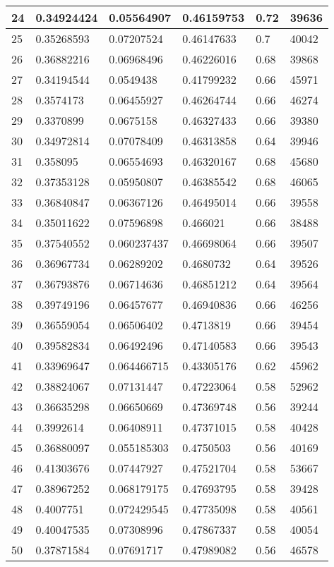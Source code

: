 \begin{longtable}{|l|l|l|l|l|l|}
24 & 0.34924424 & 0.05564907 & 0.46159753 & 0.72 & 39636 \\ \hline 
25 & 0.35268593 & 0.07207524 & 0.46147633 & 0.7 & 40042 \\ \hline 
26 & 0.36882216 & 0.06968496 & 0.46226016 & 0.68 & 39868 \\ \hline 
27 & 0.34194544 & 0.0549438 & 0.41799232 & 0.66 & 45971 \\ \hline 
28 & 0.3574173 & 0.06455927 & 0.46264744 & 0.66 & 46274 \\ \hline 
29 & 0.3370899 & 0.0675158 & 0.46327433 & 0.66 & 39380 \\ \hline 
30 & 0.34972814 & 0.07078409 & 0.46313858 & 0.64 & 39946 \\ \hline 
31 & 0.358095 & 0.06554693 & 0.46320167 & 0.68 & 45680 \\ \hline 
32 & 0.37353128 & 0.05950807 & 0.46385542 & 0.68 & 46065 \\ \hline 
33 & 0.36840847 & 0.06367126 & 0.46495014 & 0.66 & 39558 \\ \hline 
34 & 0.35011622 & 0.07596898 & 0.466021 & 0.66 & 38488 \\ \hline 
35 & 0.37540552 & 0.060237437 & 0.46698064 & 0.66 & 39507 \\ \hline 
36 & 0.36967734 & 0.06289202 & 0.4680732 & 0.64 & 39526 \\ \hline 
37 & 0.36793876 & 0.06714636 & 0.46851212 & 0.64 & 39564 \\ \hline 
38 & 0.39749196 & 0.06457677 & 0.46940836 & 0.66 & 46256 \\ \hline 
39 & 0.36559054 & 0.06506402 & 0.4713819 & 0.66 & 39454 \\ \hline 
40 & 0.39582834 & 0.06492496 & 0.47140583 & 0.66 & 39543 \\ \hline 
41 & 0.33969647 & 0.064466715 & 0.43305176 & 0.62 & 45962 \\ \hline 
42 & 0.38824067 & 0.07131447 & 0.47223064 & 0.58 & 52962 \\ \hline 
43 & 0.36635298 & 0.06650669 & 0.47369748 & 0.56 & 39244 \\ \hline 
44 & 0.3992614 & 0.06408911 & 0.47371015 & 0.58 & 40428 \\ \hline 
45 & 0.36880097 & 0.055185303 & 0.4750503 & 0.56 & 40169 \\ \hline 
46 & 0.41303676 & 0.07447927 & 0.47521704 & 0.58 & 53667 \\ \hline 
47 & 0.38967252 & 0.068179175 & 0.47693795 & 0.58 & 39428 \\ \hline 
48 & 0.4007751 & 0.072429545 & 0.47735098 & 0.58 & 40561 \\ \hline 
49 & 0.40047535 & 0.07308996 & 0.47867337 & 0.58 & 40054 \\ \hline 
50 & 0.37871584 & 0.07691717 & 0.47989082 & 0.56 & 46578 \\ \hline 
\end{longtable}